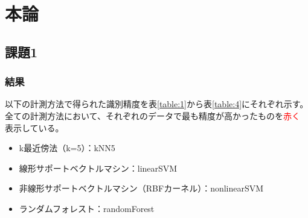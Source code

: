 \section{本論}
\subsection{課題1}
\subsubsection{結果}
以下の計測方法で得られた識別精度を表\ref{table:1}から表\ref{table:4}にそれぞれ示す。
全ての計測方法において、それぞれのデータで最も精度が高かったものを\textcolor{red}{赤く}
表示している。
\begin{itemize}
  \item k最近傍法（k=5）：kNN5
  \item 線形サポートベクトルマシン：linearSVM
  \item 非線形サポートベクトルマシン（RBFカーネル）：nonlinearSVM
  \item ランダムフォレスト：randomForest
\end{itemize}

